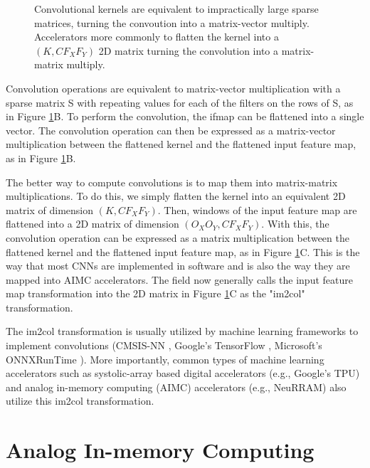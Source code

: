 \begin{figure}[htbp]
    \centering
    
    \caption{Convolutional kernels are equivalent to impractically large sparse matrices, turning the convoution into a matrix-vector multiply. Accelerators more commonly to flatten the kernel into a $(K,CF_XF_Y)$ 2D matrix turning the convolution into a matrix-matrix multiply.}
    \label{fig:conv_flattening}
\end{figure}

Convolution operations are equivalent to matrix-vector multiplication with a sparse matrix S with repeating values for each of the filters on the rows of S, as in Figure \ref{fig:conv_flattening}B. To perform the convolution, the ifmap can be flattened into a single vector. The convolution operation can then be expressed as a matrix-vector multiplication between the flattened kernel and the flattened input feature map, as in Figure \ref{fig:conv_flattening}B. 

The better way to compute convolutions is to map them into matrix-matrix multiplications. To do this, we simply flatten the kernel into an equivalent 2D matrix of dimension $(K,CF_XF_Y)$. Then, windows of the input feature map are flattened into a 2D matrix of dimension $(O_XO_Y,CF_XF_Y)$. With this, the convolution operation can be expressed as a matrix multiplication between the flattened kernel and the flattened input feature map, as in Figure \ref{fig:conv_flattening}C. This is the way that most CNNs are implemented in software and is also the way they are mapped into AIMC accelerators. The field now generally calls the input feature map transformation into the 2D matrix in Figure \ref{fig:conv_flattening}C as the "im2col" transformation.

The im2col transformation is usually utilized by machine learning frameworks to implement convolutions (CMSIS-NN \cite{lai2018cmsis}, Google's TensorFlow \cite{jacob2018quantization}, Microsoft's ONNXRunTime \cite{onnxruntime} ). More importantly, common types of machine learning accelerators such as systolic-array based digital accelerators (e.g., Google's TPU) \cite{jouppi2017datacenter} and analog in-memory computing (AIMC) accelerators (e.g., NeuRRAM) \cite{wanneurram} also utilize this im2col transformation.

\section{Analog In-memory Computing} 
\label{section:aimc}
 
